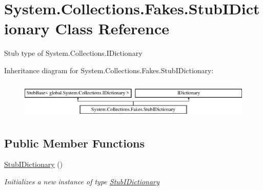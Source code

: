 \hypertarget{class_system_1_1_collections_1_1_fakes_1_1_stub_i_dictionary}{\section{System.\-Collections.\-Fakes.\-Stub\-I\-Dictionary Class Reference}
\label{class_system_1_1_collections_1_1_fakes_1_1_stub_i_dictionary}
}


Stub type of System.\-Collections.\-I\-Dictionary 


Inheritance diagram for System.\-Collections.\-Fakes.\-Stub\-I\-Dictionary\-:\begin{figure}[H]
\begin{center}
\leavevmode
\includegraphics[height=1.830065cm]{class_system_1_1_collections_1_1_fakes_1_1_stub_i_dictionary}
\end{center}
\end{figure}
\subsection*{Public Member Functions}
\begin{DoxyCompactItemize}
\item 
\hyperlink{class_system_1_1_collections_1_1_fakes_1_1_stub_i_dictionary_a75fb20957f2a72eb5629de3637730756}{Stub\-I\-Dictionary} ()
\begin{DoxyCompactList}\small\item\em Initializes a new instance of type \hyperlink{class_system_1_1_collections_1_1_fakes_1_1_stub_i_dictionary}{Stub\-I\-Dictionary}\end{DoxyCompactList}\end{DoxyCompactItemize}
